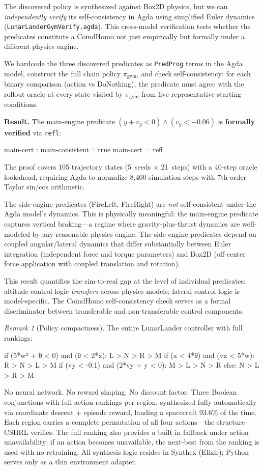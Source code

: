 \documentclass[9pt,a4paper]{article}
\newcommand{\fpath}[1]{\nolinkurl{#1}}
\theoremstyle{plain}
\theoremstyle{definition}
\theoremstyle{remark}
\newtheorem{remark}{Remark}
\begin{document}
The discovered policy is synthesized against Box2D physics,
but we can \emph{independently verify} its self-consistency in Agda
using simplified Euler dynamics
(\fpath{LunarLanderGymVerify.agda}).
This cross-model verification tests whether the predicates constitute
a CoindHomo not just empirically but formally under a
different physics engine.

We hardcode the three discovered predicates as
\texttt{PredProg} terms in the Agda model, construct the full
chain policy $\pi_{\text{gym}}$, and check self-consistency:
for each binary comparison (action vs DoNothing), the predicate
must agree with the rollout oracle at every state visited by
$\pi_{\text{gym}}$ from five representative starting conditions.

\textbf{Result.}
The main-engine predicate $(y + v_y < 0) \wedge (v_y < -0.06)$
is \textbf{formally verified} via \texttt{refl}:
\begin{spec}
  main-cert : main-consistent ≡ true
  main-cert = refl
\end{spec}
The proof covers 105 trajectory states (5~seeds $\times$ 21~steps)
with a 40-step oracle lookahead, requiring Agda to normalize
8{,}400 simulation steps with 7th-order Taylor sin/cos arithmetic.

The side-engine predicates (FireLeft, FireRight) are
\emph{not} self-consistent under the Agda model's dynamics.
This is physically meaningful: the main-engine predicate captures
vertical braking---a regime where gravity-plus-thrust dynamics are
well-modeled by any reasonable physics engine. The side-engine
predicates depend on coupled angular/lateral dynamics
that differ substantially between Euler integration (independent
force and torque parameters) and Box2D (off-center force application
with coupled translation and rotation).

This result quantifies the sim-to-real gap at the level of
individual predicates: altitude control logic \emph{transfers}
across physics models; lateral control logic is model-specific.
The CoindHomo self-consistency check serves as a formal
discriminator between transferable and non-transferable
control components.

\begin{remark}[Policy compactness]
The entire LunarLander controller with full rankings:
\begin{spec}
  if (5*w² + θ < 0) and (θ < 2*x):    L > N > R > M
  if (x < 4*θ) and (vx < 5*w):        R > N > L > M
  if (vy < -0.1) and (2*vy + y < 0):  M > L > N > R
  else:                                N > L > R > M
\end{spec}
No neural network. No reward shaping. No discount factor.
Three Boolean conjunctions with full action rankings per region,
synthesized fully automatically via coordinate descent + episode
reward, landing a spacecraft 93.6\% of the time. Each region
carries a complete permutation of all four actions---the
structure CSHRL verifies. The full ranking also provides a
built-in fallback under action unavailability: if an action
becomes unavailable, the next-best from the ranking is used
with no retraining. All synthesis logic resides in
Synthex (Elixir); Python serves only as a thin environment adapter.
\end{remark}
\end{document}
